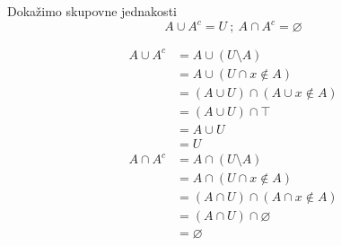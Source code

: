 \documentclass{article}
\begin{document}
    \noindent
    Dokažimo skupovne jednakosti
    $$A\cup A^c=U\ ;\ A\cap A^c=\varnothing$$

    \begin{align*}
        A\cup A^c &= A\cup (U\setminus A)\tag{$X^c=U\setminus X$}\\
                  &= A\cup (U\cap x\notin A)\tag{$X\setminus Y=X\cap x\notin Y$}\\
                  &= (A\cup U)\cap (A\cup x\notin A)\tag{DeMorganovi zakoni}\\
                  &= (A\cup U)\cap \top\tag{$A\cup x\notin A=\top \ [neprazan\ skup]$}\\
                  &= A\cup U\tag{$X\cap \top=X$}\\
                  &= U\tag{$X\cup U=U$}
    \end{align*}
    \begin{align*}
        A\cap A^c &= A\cap (U\setminus A)\tag{$X^c=U\setminus X$}\\
                  &= A\cap (U\cap x\notin A)\tag{$X\setminus Y=X\cap x\notin Y$}\\
                  &= (A\cap U)\cap (A\cap x\notin A)\tag{DeMorganovi zakoni}\\
                  &= (A\cap U)\cap \varnothing\tag{$A\cap x\notin A=\varnothing $}\\
                  &= \varnothing \tag{$X\cap \varnothing=\varnothing$}\\
    \end{align*}
\end{document}
